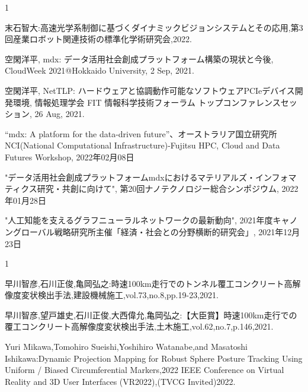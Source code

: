 \begin{招待講演}{1}

末石智大:高速光学系制御に基づくダイナミックビジョンシステムとその応用,第3回産業ロボット関連技術の標準化学術研究会,2022.

空閑洋平, mdx: データ活用社会創成プラットフォーム構築の現状と今後, CloudWeek 2021@Hokkaido University, 2 Sep, 2021.

空閑洋平, NetTLP: ハードウェアと協調動作可能なソフトウェアPCIeデバイス開発環境, 情報処理学会 FIT 情報科学技術フォーラム トップコンファレンスセッション, 26 Aug, 2021.




  “mdx: A platform for the data-driven future”、オーストラリア国立研究所NCI(National Computational Infrastructure)-Fujitsu HPC, Cloud and Data Futures Workshop, 2022年02月08日

  "データ活用社会創成プラットフォームmdxにおけるマテリアルズ・インフォマティクス研究・共創に向けて", 第20回ナノテクノロジー総合シンポジウム, 2022年01月28日

  "人工知能を支えるグラフニューラルネットワークの最新動向", 2021年度キャノングローバル戦略研究所主催「経済・社会との分野横断的研究会」, 2021年12月23日


\end{招待講演}

\begin{招待論文}{1}

早川智彦,石川正俊,亀岡弘之:時速100km走行でのトンネル覆工コンクリート高解像度変状検出手法,建設機械施工,vol.73,no.8,pp.19-23,2021.

早川智彦,望戸雄史,石川正俊,大西偉允,亀岡弘之:【大臣賞】時速100km走行での覆工コンクリート高解像度変状検出手法,土木施工,vol.62,no.7,p.146,2021.

Yuri Mikawa,Tomohiro Sueishi,Yoshihiro Watanabe,and Masatoshi Ishikawa:Dynamic Projection Mapping for Robust Sphere Posture Tracking Using Uniform / Biased Circumferential Markers,2022 IEEE Conference on Virtual Reality and 3D User Interfaces (VR2022),(TVCG Invited)2022.


\end{招待論文}

